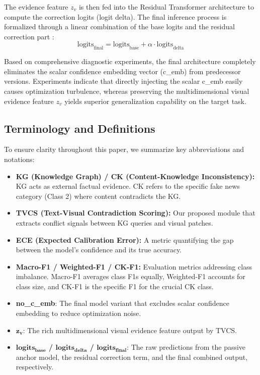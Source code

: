 The evidence feature $z_v$ is then fed into the Residual Transformer architecture \cite{ref8} to compute the correction logits (logit delta). The final inference process is formalized through a linear combination of the base logits and the residual correction part \cite{ref9}:
\begin{equation}
\text{logits}_{\text{final}} = \text{logits}_{\text{base}} + \alpha \cdot \text{logits}_{\text{delta}}
\end{equation}

Based on comprehensive diagnostic experiments, the final architecture completely eliminates the scalar confidence embedding vector (c\_emb) from predecessor versions. Experiments indicate that directly injecting the scalar c\_emb easily causes optimization turbulence, whereas preserving the multidimensional visual evidence feature $z_v$ yields superior generalization capability on the target task.

\subsection{Terminology and Definitions}
To ensure clarity throughout this paper, we summarize key abbreviations and notations:
\begin{itemize}
    \item \textbf{KG (Knowledge Graph) / CK (Content-Knowledge Inconsistency):} KG acts as external factual evidence. CK refers to the specific fake news category (Class 2) where content contradicts the KG.
    \item \textbf{TVCS (Text-Visual Contradiction Scoring):} Our proposed module that extracts conflict signals between KG queries and visual patches.
    \item \textbf{ECE (Expected Calibration Error):} A metric quantifying the gap between the model's confidence and its true accuracy.
    \item \textbf{Macro-F1 / Weighted-F1 / CK-F1:} Evaluation metrics addressing class imbalance. Macro-F1 averages class F1s equally, Weighted-F1 accounts for class size, and CK-F1 is the specific F1 for the crucial CK class.
    \item \textbf{no\_c\_emb}: The final model variant that excludes scalar confidence embedding to reduce optimization noise.
    \item \textbf{$\mathbf{z_v}$}: The rich multidimensional visual evidence feature output by TVCS.
    \item \textbf{$\mathbf{logits_{base}}$ / $\mathbf{logits_{delta}}$ / $\mathbf{logits_{final}}$}: The raw predictions from the passive anchor model, the residual correction term, and the final combined output, respectively.
\end{itemize}

